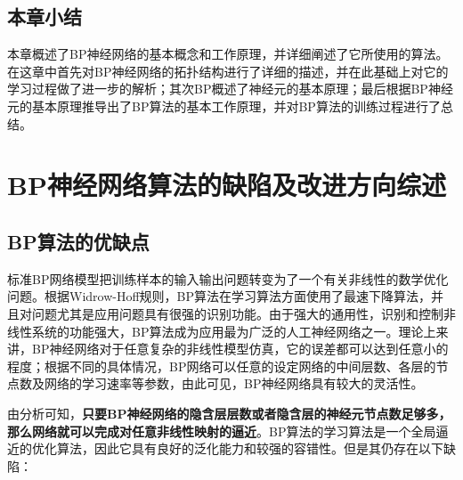 \documentclass[UTF8]{ctexart}
\begin{document}
\subsection{本章小结}

本章概述了BP神经网络的基本概念和工作原理，并详细阐述了它所使用的算法。在这章中首先对BP神经网络的拓扑结构进行了详细的描述，并在此基础上对它的学习过程做了进一步的解析；其次BP概述了神经元的基本原理；最后根据BP神经元的基本原理推导出了BP算法的基本工作原理，并对BP算法的训练过程进行了总结。

\section{BP神经网络算法的缺陷及改进方向综述}

\subsection{BP算法的优缺点}

标准BP网络模型把训练样本的输入输出问题转变为了一个有关非线性的数学优化问题。根据Widrow-Hoff规则，BP算法在学习算法方面使用了最速下降算法，并且对问题尤其是应用问题具有很强的识别功能。由于强大的通用性，识别和控制非线性系统的功能强大，BP算法成为应用最为广泛的人工神经网络之一。理论上来讲，BP神经网络对于任意复杂的非线性模型仿真，它的误差都可以达到任意小的程度；根据不同的具体情况，BP网络可以任意的设定网络的中间层数、各层的节点数及网络的学习速率等参数，由此可见，BP神经网络具有较大的灵活性。 \par

由分析可知，\textbf{只要BP神经网络的隐含层层数或者隐含层的神经元节点数足够多，那么网络就可以完成对任意非线性映射的逼近}。BP算法的学习算法是一个全局逼近的优化算法，因此它具有良好的泛化能力和较强的容错性。但是其仍存在以下缺陷： \par
\end{document}
